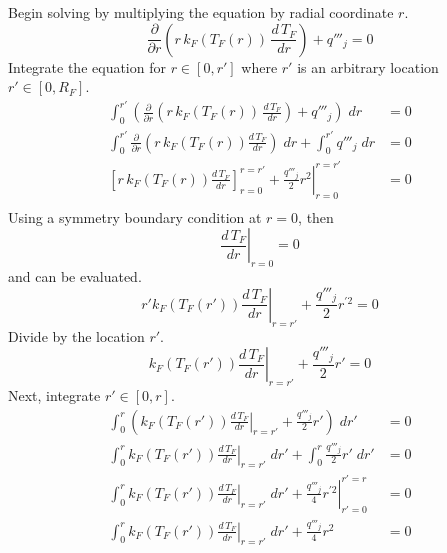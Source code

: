       Begin solving  by multiplying the
      equation by radial coordinate $r$.
      \begin{equation}
        \frac{\partial}{\partial r} \left( r\, k_F(T_F(r)) \, \frac{d\, T_F}{dr} 
        \right) + q'''_j = 0
      \end{equation}
      Integrate the equation for $r \in [0,r']$ where $r'$ is an arbitrary
      location $r' \in [0,R_F]$.
      \begin{align}
        \int_0^{r'} \left( \frac{\partial}{\partial r} \left( r\, k_F(T_F(r)) \, 
          \frac{d\, T_F}{dr} \right) + q'''_j \right) \; dr &= 0 \\
        \int_0^{r'} \frac{\partial}{\partial r} \left( r\, k_F(T_F(r)) 
          \frac{d \, T_F}{dr} \right) \; dr + \int_0^{r'} q'''_j \; dr &= 0 \\
        \label{eq:need_bc}
        \left[ r \, k_F(T_F(r)) \frac{d\,T_F}{dr} \right]_{r=0}^{r=r'} + 
          \left. \frac{q'''_j}{2} r^2 \right|_{r=0}^{r=r'} &= 0 \\
      \end{align}
      Using a symmetry boundary condition at $r=0$, then 
      \begin{equation}
        \left. \frac{d \, T_F}{dr} \right|_{r=0} = 0
      \end{equation}
      and  can be evaluated.
      \begin{equation}
        \label{eq:dtdr_fuel}
        \left. r' k_F(T_F(r')) \frac{d\,T_F}{dr} \right|_{r=r'} + 
          \frac{q'''_j}{2} r^{\prime 2} = 0
      \end{equation}
      Divide by the location $r'$.
      \begin{equation}
        \left. k_F(T_F(r')) \frac{d \, T_F}{dr}\right|_{r=r'} + 
          \frac{q'''_j}{2} r' = 0
      \end{equation}
      Next, integrate $r' \in [0,r]$.
      \begin{align}
        \int_0^r \left( k_F(T_F(r')) \left. \frac{d\,T_F}{dr}\right|_{r=r'} 
          + \frac{q'''_j}{2} r' \right) \; dr' &= 0 \\
        \int_0^r k_F(T_F(r')) \left. \frac{d\,T_F}{dr}\right|_{r=r'} \; dr' + 
          \int_0^r \frac{q'''_j}{2} r' \; dr' &= 0 \\
        \int_0^r k_F(T_F(r')) \left. \frac{d\,T_F}{dr}\right|_{r=r'} \; dr' + 
          \left. \frac{q'''_j}{4} r^{\prime 2} \right|_{r'=0}^{r'=r} &= 0 \\
        \int_0^r k_F(T_F(r')) \left. \frac{d\,T_F}{dr}\right|_{r=r'} \; dr' + 
          \frac{q'''_j}{4} r^2 &= 0
      \end{align}
